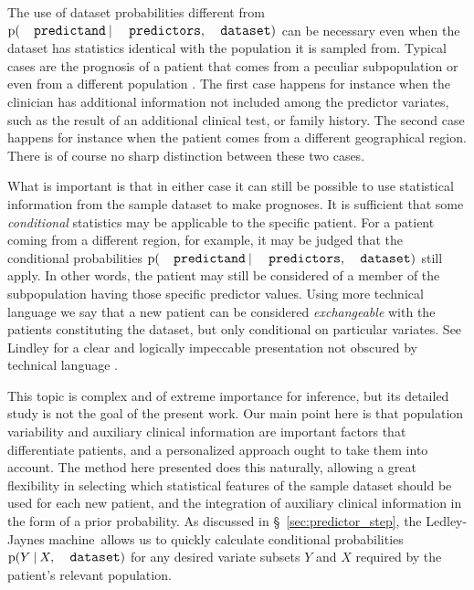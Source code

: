 \documentclass[utf8]{FrontiersinHarvard} %
\newcommand*{\sect}{\S}%
\newcommand*{\sects}{\S\S}%
\newcommand*{\chap}{ch.}%
\newcommand*{\p}{\mathrm{p}}%
\renewcommand*{\|}[1][]{\nonscript\:#1\vert\nonscript\:\mathopen{}}
\newcommand*{\ljm}{Ledley-Jaynes machine}
\begin{document}
\medskip

The use of dataset probabilities different from $\p(\texttt{\small predictand} \| \texttt{\small predictors}, \texttt{\small dataset})$ can be necessary even when the dataset has statistics identical with the population it is sampled from. Typical cases are the prognosis of a patient that comes from a peculiar subpopulation or even from a different population \citetext{\citealt{lindleyetal1981}; \citealt{quintanaetal2017}; \citealt[\chap~4]{soxetal1988_r2013}; \citealt[\chap~5]{huninketal2001_r2014}}. The first case happens for instance when the clinician has additional information not included among the predictor variates, such as the result of an additional clinical test, or family history. The second case happens for instance when the patient comes from a different geographical region. There is of course no sharp distinction between these two cases.

What is important is that in either case it can still be possible to use statistical information from the sample dataset to make prognoses. It is sufficient that some \emph{conditional} statistics may be applicable to the specific patient. For a patient coming from a different region, for example, it may be judged that the conditional probabilities $\p(\texttt{\small predictand} \| \texttt{\small predictors}, \texttt{\small dataset})$ still apply. In other words, the patient may still be considered of a member of the subpopulation having those specific predictor values. Using more technical language we say that a new patient can be considered \emph{exchangeable} with the patients constituting the dataset, but only conditional on particular variates. See Lindley \citetext{\citeyear[especially around \sects~7.3, 8.6]{lindley2006_r2014}; \citeyear{lindleyetal1981}} for a clear and logically impeccable presentation not obscured by technical language \citetext{more technical references are \citealt[\sects~4.2--4.3]{definetti1930,definetti1937,dawid2013,bernardoetal1994_r2000}; see also \citealt{malinasetal2004_r2016}, \citealt{sprengeretal2021} about confounding and Simpson's paradox, to which this topic is tightly related}.

This topic is complex and of extreme importance for inference, but its detailed study is not the goal of the present work. Our main point here is that population variability and auxiliary clinical information are important factors that differentiate patients, and a personalized approach ought to take them into account. The method here presented does this naturally, allowing a great flexibility in selecting which statistical features of the sample dataset should be used for each new patient, and the integration of auxiliary clinical information in the form of a prior probability. As discussed in \sect~\ref{sec:predictor_step}, the \ljm\ allows us to quickly calculate conditional probabilities $\p(Y\|X, \texttt{\small dataset})$ for any desired variate subsets $Y$ and $X$ required by the patient's relevant population.
\end{document}
